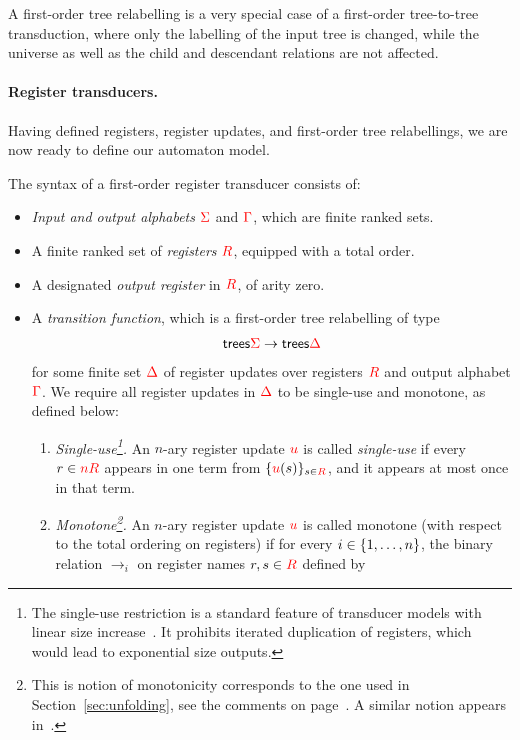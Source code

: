 A first-order tree relabelling is a very special case of a first-order tree-to-tree transduction, where only the labelling of the input tree is changed, while the universe as well as the child and descendant relations are not affected. 

\paragraph*{Register transducers.} Having defined registers, register updates, and first-order tree relabellings, we are now ready to define our automaton model.


\begin{definition}\label{def:stt}
The syntax of a first-order register transducer consists of: 
\begin{itemize}
    \item \emph{Input and output alphabets} ${\color{red}{\Sigma}}$ and ${\color{red}{\Gamma}}$, which are finite ranked sets.
    \item A finite ranked set of \emph{registers} ${{\color{red}{R}}}$, equipped with a total order.
    \item A designated \emph{output register} in ${{\color{red}{R}}}$, of arity zero.
    \item A \emph{transition function}, which is a  first-order tree relabelling of type
    \begin{align*}
      \mathsf {trees}{{\color{red}{\Sigma}}} \to \mathsf {trees}{{\color{red}{\Delta}}}
    \end{align*}for some finite set ${\color{red}{\Delta}}$ of  register updates over registers ${{\color{red}{R}}}$ and output alphabet ${\color{red}{\Gamma}}$. We require  all register updates in  ${\color{red}{\Delta}}$ to be single-use and monotone, as defined below:
    \begin{enumerate}
        \item \emph{Single-use\footnote{The  single-use restriction  is a standard feature of transducer models with linear size increase~\cite{bloem_comparison_2000, alurStreamingStringTransducers2011,alur2017streaming}.   It prohibits iterated duplication of registers, which would lead to exponential size outputs.    
        }.}  An $n$-ary register update ${\color{red}{u}}$ is  called  \emph{single-use} if   every $r \in {\color{red}{n {{\color{red}{R}}}}}$
        appears in one term from $\{{\color{red}{u}}(s)\}_{s \in {{\color{red}{R}}}}$, and it appears at most once in that term. 
        \item \emph{Monotone\footnote{This is notion of monotonicity corresponds to the one used in Section~\ref{sec:unfolding}, see the comments on page~\pageref{page:monotone-discussed}. A similar notion  appears in~\cite[p. 7]{bojanczykRegularFirstOrderList2018}.}.} An $n$-ary  register update ${\color{red}{u}}$ is called monotone (with respect to the total ordering on registers) if for every $i \in \{1,\ldots,n\}$, the binary relation $\to_i$ on register names $r,s \in {{\color{red}{R}}}$  defined by

\end{enumerate}
\end{itemize}
\end{definition}
